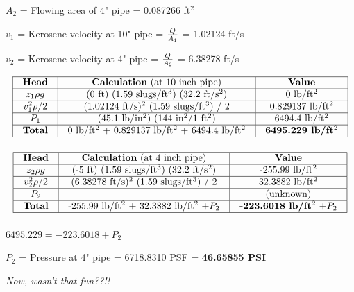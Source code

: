 $A_2$ = Flowing area of 4" pipe = 0.087266 ft$^{2}$

\vskip 10pt

$v_1$ = Kerosene velocity at 10" pipe = $Q \over A_1$ = 1.02124 ft/s

\vskip 10pt

$v_2$ = Kerosene velocity at 4" pipe = $Q \over A_2$ = 6.38278 ft/s


$$\vbox{\offinterlineskip
\halign{\strut
\vrule \quad\hfil # \ \hfil & 
\vrule \quad\hfil # \ \hfil & 
\vrule \quad\hfil # \ \hfil \vrule \cr
\noalign{\hrule}
%
{\bf Head} & {\bf Calculation} (at 10 inch pipe) & {\bf Value} \cr
%
\noalign{\hrule}
%
$z_1 \rho g$ & (0 ft) (1.59 slugs/ft$^{3}$) (32.2 ft/s$^{2}$) & 0 lb/ft$^{2}$ \cr
%
\noalign{\hrule}
%
$v_1^2 \rho / 2$ & (1.02124 ft/s)$^{2}$ (1.59 slugs/ft$^{3}$) / 2 & 0.829137 lb/ft$^{2}$ \cr
%
\noalign{\hrule}
%
$P_1$ & (45.1 lb/in$^{2}$) (144 in$^{2}$/1 ft$^{2}$) & 6494.4 lb/ft$^{2}$ \cr
%
\noalign{\hrule}
%
{\bf Total} &  0 lb/ft$^{2}$ + 0.829137 lb/ft$^{2}$ + 6494.4 lb/ft$^{2}$ & {\bf 6495.229 lb/ft$^{2}$} \cr
%
\noalign{\hrule}
} %
}$$ %


$$\vbox{\offinterlineskip
\halign{\strut
\vrule \quad\hfil # \ \hfil & 
\vrule \quad\hfil # \ \hfil & 
\vrule \quad\hfil # \ \hfil \vrule \cr
\noalign{\hrule}
%
{\bf Head} & {\bf Calculation} (at 4 inch pipe) & {\bf Value} \cr
%
\noalign{\hrule}
%
$z_2 \rho g$ & (-5 ft) (1.59 slugs/ft$^{3}$) (32.2 ft/s$^{2}$) & -255.99 lb/ft$^{2}$ \cr
%
\noalign{\hrule}
%
$v_2^2 \rho / 2$ & (6.38278 ft/s)$^{2}$ (1.59 slugs/ft$^{3}$) / 2 & 32.3882 lb/ft$^{2}$ \cr
%
\noalign{\hrule}
%
$P_2$ &  & (unknown) \cr
%
\noalign{\hrule}
%
{\bf Total} &  -255.99 lb/ft$^{2}$ + 32.3882 lb/ft$^{2}$ $+ P_2$ & {\bf -223.6018 lb/ft$^{2}$} $+ P_2$ \cr
%
\noalign{\hrule}
} %
}$$ %

$6495.229 = -223.6018 + P_2$

\vskip 10pt

$P_2$ = Pressure at 4" pipe = 6718.8310 PSF = {\bf 46.65855 PSI}

\vskip 10pt

{\it Now, wasn't that fun??!!}




